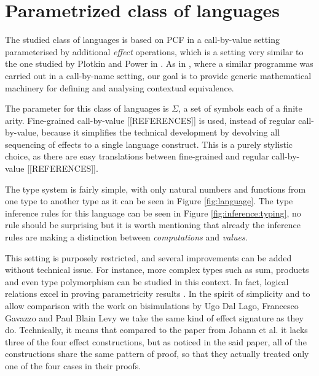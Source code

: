 \section{Parametrized class of languages}

The studied class of languages is based on PCF \cite{plotkin1977lcf} in a call-by-value setting 
parameterised by additional \emph{effect} operations, which is a setting very similar to 
the one studied by Plotkin and Power in \cite{plotkin2001adequacy}. 
As in  \cite{gom}, where a similar programme was carried out in a call-by-name setting,
our goal is to provide generic mathematical machinery for defining and 
analysing contextual equivalence. 

The parameter for this class of languages is $\Sigma$,  
a set of symbols each of a finite arity.
Fine-grained call-by-value [[REFERENCES]]  is used, instead of regular call-by-value,
because it simplifies the technical development by devolving all sequencing of effects to a single
language construct. 
This is a purely stylistic choice, as there are easy translations between fine-grained and regular call-by-value
[[REFERENCES]].

The type system is fairly simple, with only 
natural numbers and functions from one 
type to another type as it can be seen in Figure \ref{fig:language}.
The type inference rules for this language can be seen in Figure
\ref{fig:inference:typing}, no rule should be surprising
but it is worth mentioning that already the inference 
rules are making a distinction between \emph{computations}
and \emph{values}.

This setting is purposely restricted, and several improvements can 
be added without technical issue. For instance, more complex types 
such as sum, products and even type polymorphism can be studied 
in this context. In fact, logical relations excel in proving parametricity 
results \cite{wadler1989theorems}.
In the spirit of simplicity 
and to allow comparison with the work on bisimulations by
Ugo Dal Lago, Francesco Gavazzo and Paul Blain Levy
\cite{Ugo2017} we take the same kind of effect signature 
as they do. Technically, it means that compared to 
the paper from Johann et al. \cite{gom} it lacks 
three of the four effect constructions, but as noticed 
in the said paper, all of the constructions share the
same pattern of proof, so that they actually treated 
only one of the four cases in their proofs.


